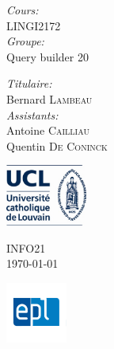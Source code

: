 \documentclass[a4paper,10pt]{article}
\begin{document}
\begin{titlepage}
\begin{minipage}{0.48\textwidth}
\begin{flushleft}
        \textit{Cours:} \\
        LINGI2172 \\ \vspace{0.3cm}
         \textit{Groupe:} \\
         Query builder 20
        

      \end{flushleft}
    \end{minipage}
    \begin{minipage}{0.48\textwidth}
      \begin{flushright} \large
        
       
        \textit{Titulaire:} \\
        Bernard \textsc{Lambeau}\\ \vspace{0.3cm}
        \textit{Assistants:} \\
        Antoine \textsc{Cailliau}\\
        Quentin \textsc{De Coninck}\\
        
      \end{flushright}
    \end{minipage}

    \vfill

    \begin{minipage}{0.3\textwidth}
      \begin{flushleft}
        \includegraphics[height=2cm]{logo_UCL.jpg}
      \end{flushleft}
    \end{minipage}
    \begin{minipage}{0.3\textwidth}
      \begin{center}
        {\large INFO21}\\
        {\large \today}
      \end{center}
    \end{minipage}
    \begin{minipage}{0.3\textwidth}
      \begin{flushright}
        \includegraphics[height=2cm]{logo_EPL.jpg}
      \end{flushright}
    \end{minipage}
\end{titlepage}
\end{document}
